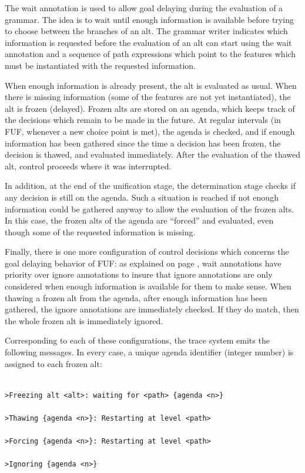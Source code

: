 \documentclass[10pt,a4paper]{report}
\begin{document}
The wait annotation is used to allow goal delaying during the evaluation of
a grammar.  The idea is to wait until enough information is available
before trying to choose between the branches of an alt.  The grammar writer
indicates which information is requested before the evaluation of an
alt can start using the wait annotation and a sequence of path expressions
which point to the features which must be instantiated with the requested
information.  

When enough information is already present, the alt is evaluated as usual.
When there is missing information (some of the features are not yet
instantiated), the alt is frozen (delayed).  Frozen alts are stored on an
agenda, which keeps track of the decisions which remain to be made in the
future.  At regular intervals (in FUF, whenever a new choice point is met),
the agenda is checked, and if enough information has been gathered since
the time a decision has been frozen, the decision is thawed, and evaluated
immediately.  After the evaluation of the thawed alt, control proceeds
where it was interrupted.

In addition, at the end of the unification stage, the determination stage
checks if any decision is still on the agenda.  Such a situation is reached
if not enough information could be gathered anyway to allow the evaluation
of the frozen alts.  In this case, the frozen alts of the agenda are
``forced'' and evaluated, even though some of the requested information is
missing.  

Finally, there is one more configuration of control decisions which
concerns the goal delaying behavior of FUF:  as explained on page
\pageref{wait-ignore}, wait annotations have priority over ignore
annotations to insure that ignore annotations are only considered when
enough information is available for them to make sense.  When thawing a
frozen alt from the agenda, after enough information has been gathered, the
ignore annotations are immediately checked.  If they do match, then the
whole frozen alt is immediately ignored.

Corresponding to each of these configurations, the trace system emits the
following messages.  In every case, a unique agenda identifier (integer
number) is assigned to each frozen alt:

\begin{lstlisting}[language=Lisp]

>Freezing alt <alt>: waiting for <path> {agenda <n>}

>Thawing {agenda <n>}: Restarting at level <path>

>Forcing {agenda <n>}: Restarting at level <path>

>Ignoring {agenda <n>}

\end{lstlisting}
\end{document}
